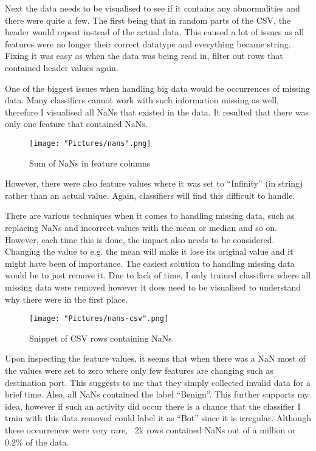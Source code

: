 \documentclass[11pt]{article}
\begin{document}
Next the data needs to be visualised to see if it contains any abnormalities and there were quite a few. The first being that in random parts of the CSV, the header would repeat instead of the actual data. This caused a lot of issues as all features were no longer their correct datatype and everything became string. Fixing it was easy as when the data was being read in, filter out rows that contained header values again. 

One of the biggest issues when handling big data would be occurrences of missing data. Many classifiers cannot work with such information missing as well, therefore I visualised all NaNs that existed in the data. It resulted that there was only one feature that contained NaNs. 

\begin{figure}[h!]
   \texttt{[image: "Pictures/nans".png]}
   \caption{Sum of NaNs in feature columns}
   \label{fig:nans}
\end{figure}

However, there were also feature values where it was set to “Infinity” (in string) rather than an actual value. Again, classifiers will find this difficult to handle.

There are various techniques when it comes to handling missing data, such as replacing NaNs and incorrect values with the mean or median and so on. However, each time this is done, the impact also needs to be considered. Changing the value to e.g. the mean will make it lose its original value and it might have been of importance. The easiest solution to handling missing data would be to just remove it. Due to lack of time, I only trained classifiers where all missing data were removed however it does need to be visualised to understand why there were in the first place. 

\begin{figure}[h!]
   \texttt{[image: "Pictures/nans-csv".png]}
   \caption{Snippet of CSV rows containing NaNs}
   \label{fig:nans-csv}
\end{figure}

Upon inspecting the feature values, it seems that when there was a NaN most of the values were set to zero where only few features are changing such as destination port. This suggests to me that they simply collected invalid data for a brief time. Also, all NaNs contained the label “Benign”. This further supports my idea, however if such an activity did occur there is a chance that the classifier I train with this data removed could label it as “Bot” since it is irregular. Although these occurrences were very rare, ~2k rows contained NaNs out of a million or 0.2\% of the data. 
\end{document}
